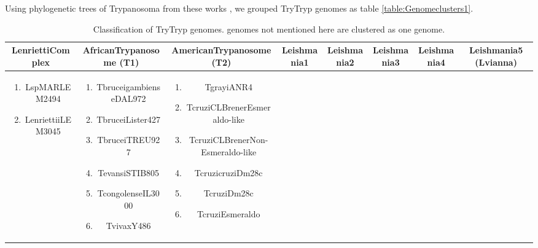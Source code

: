 \documentclass[table,
12pt, %
a4paper, %
oneside, %
headinclude,footinclude, %
BCOR5mm, %
]{scrartcl}
\begin{document}
Using phylogenetic trees of Trypanosoma from these works \cite{Souza:2018dg,Hughes:2003,Pothirat:2014,Kelly:2017}, we grouped TryTryp genomes as table \ref{table:Genomeclusters1}.\\
\begin{table}[hbt]
  \caption{Classification of TryTryp genomes. genomes not mentioned here are clustered as one genome.}
  \begin{adjustbox}{width=\columnwidth,center}
    \begin{tabular}{|c|c|c|c|c|c|c|c|}
      \toprule LenriettiComplex                           & AfricanTrypanosome (T1)                            & AmericanTrypanosome (T2)                           & Leishmania1                                        & Leishmania2                                        & Leishmania3                                        & Leishmania4                                        & Leishmania5 (Lvianna)                              \\\midrule
      \parbox{.45\textwidth} {\begin{enumerate}
          \item LspMARLEM2494
          \item LenriettiiLEM3045
        \end{enumerate}} & \parbox{.45\textwidth}{\begin{enumerate}
          \item TbruceigambienseDAL972
          \item TbruceiLister427
          \item TbruceiTREU927
          \item TevansiSTIB805
          \item TcongolenseIL3000
          \item TvivaxY486
        \end{enumerate}} & \parbox{.45\textwidth}{\begin{enumerate}
          \item TgrayiANR4
          \item TcruziCLBrenerEsmeraldo-like
          \item TcruziCLBrenerNon-Esmeraldo-like
          \item TcruzicruziDm28c
          \item TcruziDm28c
          \item TcruziEsmeraldo

\end{enumerate}}
\end{tabular}
\end{adjustbox}
\end{table}
\end{document}
